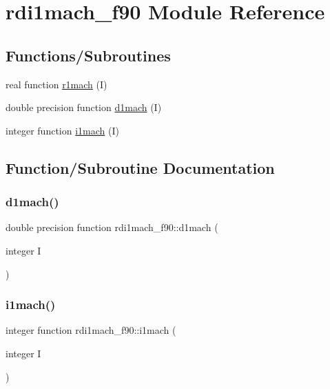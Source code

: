 \hypertarget{namespacerdi1mach__f90}{}\section{rdi1mach\+\_\+f90 Module Reference}
\label{namespacerdi1mach__f90}
\subsection*{Functions/\+Subroutines}
\begin{DoxyCompactItemize}
\item 
real function \hyperlink{namespacerdi1mach__f90_a980c645c9cef138b3dbc0b2f1ab2e04d}{r1mach} (I)
\item 
double precision function \hyperlink{namespacerdi1mach__f90_a71577a35707793435a9266e3b470c391}{d1mach} (I)
\item 
integer function \hyperlink{namespacerdi1mach__f90_a772ea48c9a61f01ff4237e78bb31c13d}{i1mach} (I)
\end{DoxyCompactItemize}


\subsection{Function/\+Subroutine Documentation}
\mbox{\label{namespacerdi1mach__f90_a71577a35707793435a9266e3b470c391}} 
\subsubsection{\texorpdfstring{d1mach()}{d1mach()}}
{\footnotesize\ttfamily double precision function rdi1mach\+\_\+f90\+::d1mach (\begin{DoxyParamCaption}\item[{integer}]{I }\end{DoxyParamCaption})}

\mbox{\label{namespacerdi1mach__f90_a772ea48c9a61f01ff4237e78bb31c13d}} 
\subsubsection{\texorpdfstring{i1mach()}{i1mach()}}
{\footnotesize\ttfamily integer function rdi1mach\+\_\+f90\+::i1mach (\begin{DoxyParamCaption}\item[{integer}]{I }\end{DoxyParamCaption})}

